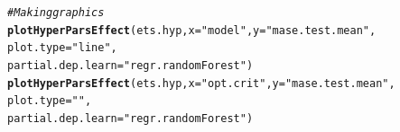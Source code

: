 \documentclass[12pt]{article}\usepackage[]{graphicx}\usepackage[]{color}
\makeatletter
\newcommand{\hlstr}[1]{\textcolor[rgb]{0.192,0.494,0.8}{#1}}%
\newcommand{\hlcom}[1]{\textcolor[rgb]{0.678,0.584,0.686}{\textit{#1}}}%
\newcommand{\hlstd}[1]{\textcolor[rgb]{0.345,0.345,0.345}{#1}}%
\newcommand{\hlkwc}[1]{\textcolor[rgb]{0.333,0.667,0.333}{#1}}%
\newcommand{\hlkwd}[1]{\textcolor[rgb]{0.737,0.353,0.396}{\textbf{#1}}}%
\newenvironment{kframe}{%
 \def\at@end@of@kframe{}%
 \ifinner\ifhmode%
  \def\at@end@of@kframe{\end{minipage}}%
  \begin{minipage}{\columnwidth}%
 \fi\fi%
 \def\FrameCommand##1{\hskip\@totalleftmargin \hskip-\fboxsep
 \colorbox{shadecolor}{##1}\hskip-\fboxsep
     \hskip-\linewidth \hskip-\@totalleftmargin \hskip\columnwidth}%
 \MakeFramed {\advance\hsize-\width
   \@totalleftmargin\z@ \linewidth\hsize
   \@setminipage}}%
 {\par\unskip\endMakeFramed%
 \at@end@of@kframe}
\newenvironment{knitrout}{}{} %
\theoremstyle{definition}
\makeatother
\begin{document}
\begin{knitrout}
\color{fgcolor}\begin{kframe}
\begin{alltt}
\hlcom{# Making graphics}
\hlkwd{plotHyperParsEffect}\hlstd{(ets.hyp,} \hlkwc{x}\hlstd{=} \hlstr{"model"}\hlstd{,} \hlkwc{y} \hlstd{=} \hlstr{"mase.test.mean"}\hlstd{,}
                     \hlkwc{plot.type} \hlstd{=} \hlstr{"line"}\hlstd{,}
                     \hlkwc{partial.dep.learn} \hlstd{=} \hlstr{"regr.randomForest"}\hlstd{)}
\hlkwd{plotHyperParsEffect}\hlstd{(ets.hyp,} \hlkwc{x}\hlstd{=} \hlstr{"opt.crit"}\hlstd{,} \hlkwc{y} \hlstd{=} \hlstr{"mase.test.mean"}\hlstd{,}
                     \hlkwc{plot.type} \hlstd{=} \hlstr{""}\hlstd{,}
                     \hlkwc{partial.dep.learn} \hlstd{=} \hlstr{"regr.randomForest"}\hlstd{)}
\end{alltt}
\end{kframe}
\end{knitrout}
\end{document}
